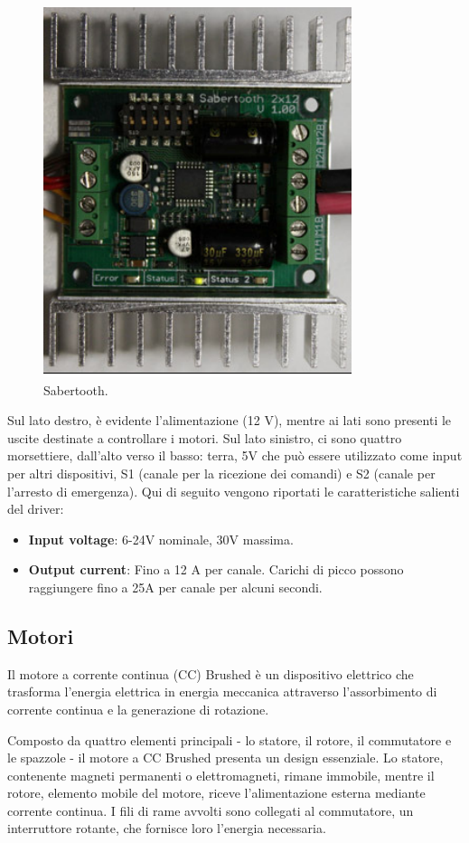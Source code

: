 \documentclass{article}
\begin{document}
\begin{figure}[H]
\centering
\includegraphics[width=0.7\linewidth]{image/saber.png}
\caption{\label{saber:pot}Sabertooth.}
\end{figure}


Sul lato destro, è evidente l'alimentazione (12 V), mentre ai lati sono presenti le uscite destinate a controllare i motori.
Sul lato sinistro, ci sono quattro morsettiere, dall'alto verso il basso: terra, 5V che può essere utilizzato come input per altri
dispositivi, S1 (canale per la ricezione dei comandi) e S2 (canale per l'arresto di emergenza).
Qui di seguito vengono riportati le caratteristiche salienti del driver:
\begin{itemize}
    \item \textbf{Input voltage}: 6-24V nominale, 30V massima.
    \item\textbf{Output current}: Fino a 12 A per canale. Carichi di picco possono raggiungere fino a 25A per canale per alcuni secondi.
\end{itemize}

\subsection{Motori}
Il motore a corrente continua (CC) Brushed è un dispositivo elettrico che trasforma l'energia elettrica in energia meccanica attraverso l'assorbimento di corrente continua e la generazione di rotazione.

Composto da quattro elementi principali - lo statore, il rotore, il commutatore e le spazzole - il motore a CC Brushed presenta un design essenziale. Lo statore, contenente magneti permanenti o elettromagneti, rimane immobile, mentre il rotore, elemento mobile del motore, riceve l'alimentazione esterna mediante corrente continua. I fili di rame avvolti sono collegati al commutatore, un interruttore rotante, che fornisce loro l'energia necessaria.
\end{document}
